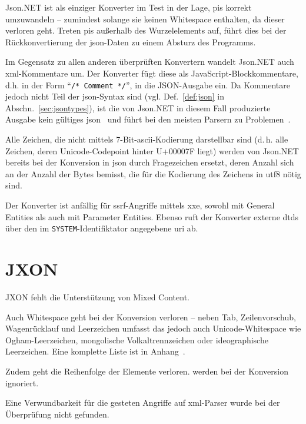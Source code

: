 Json.NET ist als einziger Konverter im Test in der Lage, \glspl{pi} korrekt umzuwandeln -- zumindest solange sie keinen Whitespace enthalten, da dieser verloren geht. Treten \glspl{pi} außerhalb des Wurzelelements auf, führt dies bei der Rückkonvertierung der \acrshort{json}-Daten zu einem Absturz des Programms.

Im Gegensatz zu allen anderen überprüften Konvertern wandelt Json.NET auch \acrshort{xml}-Kommentare um. Der Konverter fügt diese als JavaScript-Blockkommentare, d.h. in der Form \enquote{\texttt{/* Comment */}}, in die JSON-Ausgabe ein. Da Kommentare jedoch nicht Teil der \acrshort{json}-Syntax sind (vgl. Def.~\ref{def:json} in Abschn.~\ref{sec:jsontypes}), ist die von Json.NET in diesem Fall produzierte Ausgabe kein gültiges \acrshort{json}~\cite{ecma404,rfc7159} und führt bei den meisten Parsern zu Problemen~\cite[Abschn.~2.1,~4.1]{seriot2016minefield}.

Alle Zeichen, die nicht mittels 7-Bit-\acrshort{ascii}-Kodierung darstellbar sind (d.\,h. alle Zeichen, deren Unicode-Codepoint hinter U+00007F liegt) werden von Json.NET bereits bei der Konversion in \acrshort{json} durch Fragezeichen ersetzt, deren Anzahl sich an der Anzahl der Bytes bemisst, die für die Kodierung des Zeichens in \acrshort{utf8} nötig sind.

Der Konverter ist anfällig für \acrshort{ssrf}-Angriffe mittels \acrshort{xxe}, sowohl mit General Entities als auch mit Parameter Entities. Ebenso ruft der Konverter externe \glspl{dtd} über den im \texttt{SYSTEM}-Identifiktator angegebene \acrshort{uri} ab.

\section{JXON}
\label{sec:jxon}

JXON fehlt die Unterstützung von Mixed Content.

Auch Whitespace geht bei der Konversion verloren -- neben Tab, Zeilenvorschub, Wagenrücklauf und Leerzeichen umfasst das jedoch auch Unicode-Whitespace wie Ogham-Leerzeichen, mongolische Volkaltrennzeichen oder ideographische Leerzeichen. Eine komplette Liste ist in Anhang~\label{appx:unicode-whitespace}.

Zudem geht die Reihenfolge der Elemente verloren.  werden bei der Konversion ignoriert.

Eine Verwundbarkeit für die gesteten Angriffe auf \acrshort{xml}-Parser wurde bei der Überprüfung nicht gefunden.

